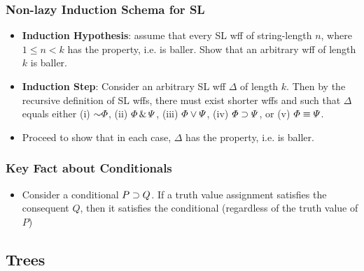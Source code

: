 \begin{frame}
\frametitle{Non-lazy Induction Schema for SL}

\begin{itemize}[<+->]

\item[] \textbf{Induction Hypothesis}: assume that every SL wff of string-length $n$, where $1 \leq n < k$ has the property, i.e. is baller. Show that an arbitrary wff of length $k$ is baller. 



\item[] \textbf{Induction Step}: Consider an arbitrary SL wff $\Delta$ of length $k$. Then by the recursive definition of SL wffs, there must exist shorter wffs \metaA{} and \metaB{} such that $\Delta$ equals either (i) $\enot  \metaA{}$, (ii) $\varPhi{} \,\&\, \varPsi{}$, (iii) $\varPhi{} \vee \varPsi{}$, (iv) $\varPhi{} \supset \varPsi{}$, or (v) $\varPhi{} \equiv \varPsi{}$. 

\item Proceed to show that in each case, $\Delta$ has the property, i.e. is baller. 

\end{itemize}
\end{frame}

\begin{frame}
\frametitle{Key Fact about Conditionals}

\begin{itemize}[<+->]

\item Consider a conditional $P \supset Q$. If a truth value assignment satisfies the consequent $Q$, then it satisfies the conditional (regardless of the truth value of $P$)



\end{itemize}
\end{frame}

\subsection{Trees}

